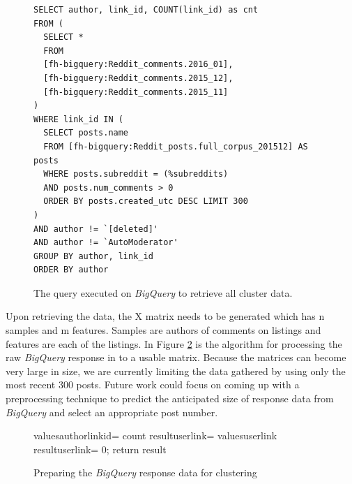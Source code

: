 \documentclass[msc,oneside]{ubcthesis}%
\begin{document}
\begin{figure}[H]
\begin{lstlisting}[showstringspaces=false]
SELECT author, link_id, COUNT(link_id) as cnt 
FROM ( 
  SELECT * 
  FROM 
  [fh-bigquery:Reddit_comments.2016_01], 
  [fh-bigquery:Reddit_comments.2015_12], 
  [fh-bigquery:Reddit_comments.2015_11] 
)
WHERE link_id IN ( 
  SELECT posts.name 
  FROM [fh-bigquery:Reddit_posts.full_corpus_201512] AS posts 
  WHERE posts.subreddit = (%subreddits) 
  AND posts.num_comments > 0 
  ORDER BY posts.created_utc DESC LIMIT 300 
) 
AND author != `[deleted]' 
AND author != `AutoModerator' 
GROUP BY author, link_id 
ORDER BY author
\end{lstlisting}
\caption[BigQuery for retrieving clustering data]{
The query executed on \textit{BigQuery} to retrieve all cluster data.}
\label{fig:clusterquery}
\end{figure}

Upon retrieving the data, the X matrix needs to be generated which has n samples and m features. Samples are authors of comments on listings and features are each of the listings. In Figure \ref{fig:responsealgo} is the algorithm for processing the raw \textit{BigQuery} response in to a usable matrix. Because the matrices can become very large in size, we are currently limiting the data gathered by using only the most recent 300 posts. Future work could focus on coming up with a preprocessing technique to predict the anticipated size of response data from \textit{BigQuery} and select an appropriate post number.

\begin{figure}[H]
	\begin{algorithm}[H]
		\SetAlgoLined
   	 	{
   	 		values\lbrack author\rbrack\lbrack linkid\rbrack = count\;
    		}
    		{
    			{
    				 {
    					result\lbrack user\rbrack\lbrack link\rbrack = values\lbrack user\rbrack\lbrack link\rbrack\;
    				}{
    					result\lbrack user\rbrack\lbrack link\rbrack = 0;
    				}
    			}
    		}
    		return result\;
    	\end{algorithm}
\caption{Preparing the \textit{BigQuery} response data for clustering}
\label{fig:responsealgo}
\end{figure}
\end{document}
